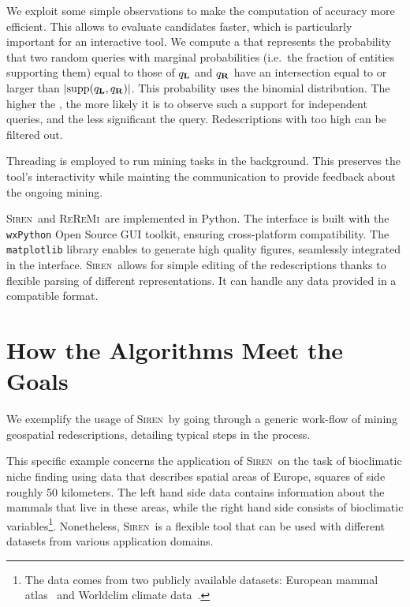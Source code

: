 \documentclass{llncs}
\renewcommand{\note}[1]{{\color{red}{#1}\par}}
\newcommand{\Siren}{\textsc{Siren}}
\newcommand{\ReReMi}{\textsc{ReReMi}}
\begin{document}
We exploit some
simple observations to make the computation of accuracy more
efficient. This allows to evaluate candidates faster, which is particularly important for an interactive tool.
We compute a \pValue{} that represents the probability that two random
queries with marginal probabilities (i.e.\ the fraction of entities
supporting them) equal to those of $q_{\mathbf{L}}$ and $q_{\mathbf{R}}$ have an
intersection equal to or larger than $\abs{\supp(q_\iLHS,
  q_\iRHS)}$. This probability uses the binomial distribution. The higher the
\pValue, the more likely it is to observe such a support for
independent queries, and the less significant the query. Redescriptions with too high \pValue{} can be filtered out.

Threading is employed to run mining tasks in the background. This preserves the tool's
interactivity while mainting the communication to provide feedback
about the ongoing mining.

\note{This had been commented out... We need to say these things don't we?}
\Siren\ and \ReReMi\ are implemented in Python.  The interface is
built with the \texttt{wxPython} Open Source GUI toolkit, ensuring
cross-platform compatibility. 
 The \texttt{matplotlib} library enables
to generate high quality figures, seamlessly integrated in the
interface.  \Siren\ allows for simple editing of the redescriptions
thanks to flexible parsing of different representations. It can handle
any data provided in a compatible format.  

\section{How the Algorithms Meet the Goals}
\label{sec:scenarios}

\note{The old use-case scenario text is a good basis for this, but
  needs to be re-worked a lot.\\
Do we want to talk only about the functionalities that are already implemented, can be reasonably implemented in a short delay, or any wishable functionality? And insert links to the goal section... 
}

We exemplify the usage of \Siren\ by going through a generic work-flow of
mining geospatial redescriptions, detailing typical steps in the process.  

This specific example concerns the application of \Siren\ on the task of bioclimatic niche finding using data
that describes spatial areas of Europe, squares of side roughly 50
kilometers.  The left hand side data contains information about the
mammals that live in these areas, while the right hand side consists
of bioclimatic variables\footnote{The data comes from two publicly available
datasets: European mammal atlas~\cite{mitchell-jones99atlas} and
Worldclim climate data~\cite{hijmans05very}.}.
Nonetheless, \Siren\ is a flexible tool that can be used with
different datasets from various application domains.
\end{document}
